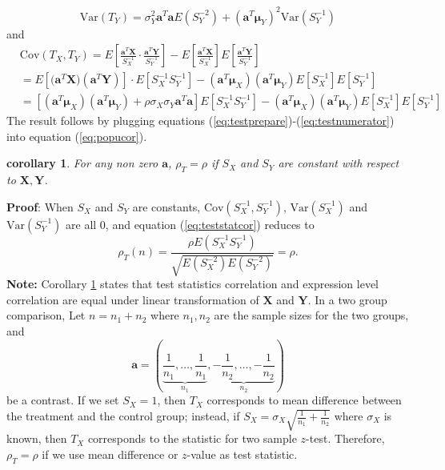 \documentclass[12pt, a4paper]{article}
\newtheorem{corollary}{corollary}
\newcommand{\cov}{\text{Cov}}
\newcommand{\var}{\text{Var}}
\begin{document}
	\begin{equation}\label{eq:testdenom2}
	\var(T_Y)= \sigma_Y^2\bm a^T\bm a E(S_Y^{-2}) + (\bm a^T\bm \mu_Y)^2\var(S_Y^{-1})
	\end{equation}
	and
	\begin{equation}\label{eq:testnumerator}
	\begin{aligned}
		&\cov(T_X, T_Y) = E\left[\frac{ \bm a^T\bm X }{S_X^{-1}}\cdot\frac{ \bm a^T\bm Y }{S_Y^{-1}}\right] - E\left[\frac{\bm a^T\bm X}{S_X^{-1}}\right]E\left[\frac{\bm a^T\bm Y}{S_Y^{-1}}\right] \\
			 & = E[\bm (\bm a^T\bm X)(\bm a^T\bm Y)]\cdot E[S_X^{-1}S_Y^{-1}]-(\bm a^T\bm \mu_X)(\bm a^T\bm \mu_Y)E[S_X^{-1}]E[S_Y^{-1}]\\
			 & = [(\bm a^T\bm \mu_X)(\bm a^T\bm \mu_Y)+ \rho \sigma_X\sigma_Y\bm a^T\bm a]E[S_X^{-1}S_Y^{-1}]- (\bm a^T\bm \mu_X)(\bm a^T\bm \mu_Y)E[S_X^{-1}]E[S_Y^{-1}]
	\end{aligned}
	\end{equation}	
	The result follows by plugging equations (\ref{eq:testprepare})-(\ref{eq:testnumerator}) into equation (\ref{eq:popucor}).
	
	\begin{corollary}\label{thm:lineartransformation} 
		For any non zero $\bm a$, $\rho_T=\rho$ if $S_X$ and $S_Y$ are constant with respect to $\bm X, \bm Y$. 
	\end{corollary}
	\textbf{Proof}: When $S_X$ and $S_Y$ are constants, $\cov(S_X^{-1}, S_Y^{-1})$, $\var(S_X^{-1}) $ and $\var(S_Y^{-1})$ are all 0, and equation (\ref{eq:teststatcor}) reduces to 
	\begin{equation}
		\rho_T(n) = \frac{\rho E(S_X^{-1}S_Y^{-1})}{\sqrt{E(S_X^{-2})E(S_Y^{-2})}} = \rho.
	\end{equation}
	\textbf{Note:} Corollary \ref{thm:lineartransformation} states that test statistics correlation and expression level correlation are equal under linear transformation of $\bm X$ and $\bm Y$. In a two group comparison, Let $n = n_1 + n_2$ where $n_1, n_2$ are the sample sizes for the two groups, and 
	\begin{equation}\label{eq:contrast}
	\bm a  = (\underbrace{\frac{1}{n_1}, \ldots, \frac{1}{n_1}}_{n_1}, \underbrace{-\frac{1}{n_2}, \ldots, -\frac{1}{n_2}}_{n_2})
	\end{equation}
 be a contrast. If we set $S_X=1$, then $T_X$ corresponds to mean difference between the treatment and the control group; instead, if $S_X = \sigma_X\sqrt{\frac{1}{n_1} + \frac{1}{n_2}}$ where $\sigma_X$ is known, then $T_X$ corresponds to the statistic for two sample $z$-test. Therefore, $\rho_T=\rho$ if we use mean difference or $z$-value as test statistic.
	
\end{document}

